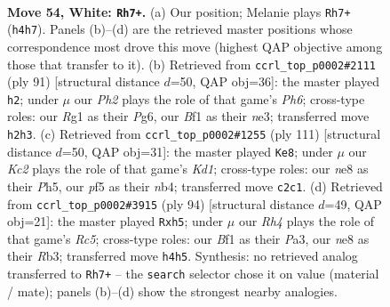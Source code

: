 \documentclass[11pt]{article}
\begin{document}
\clearpage

\begin{figure}[p]\centering
\begin{subfigure}{0.46\textwidth}\centering
\resizebox{\linewidth}{!}{%
\newchessgame
\chessboard[
  setfen={4n3/p1prk3/8/5p2/r4P1R/4B3/2K4P/5BR1 w - - 12 54},
  showmover=false,
  pgfstyle=straightmove, color=movearrow, markmove={h4-h7}
]}
\caption{}
\end{subfigure}\hfill
\begin{subfigure}{0.46\textwidth}\centering
\resizebox{\linewidth}{!}{%
\newchessgame
\chessboard[
  setfen={2rb4/5pk1/1P4p1/2P3r1/2R5/4N2p/4KP2/1R6 b - - 0 46},
  showmover=false,
  pgfstyle=straightmove, color=movearrow, markmove={h3-h2}
]}
\caption{}
\end{subfigure}
\\[4pt]
\begin{subfigure}{0.46\textwidth}\centering
\resizebox{\linewidth}{!}{%
\newchessgame
\chessboard[
  setfen={3k4/8/2P2R2/7p/1N4bP/2K2pP1/5r2/8 b - - 2 56},
  showmover=false,
  pgfstyle=straightmove, color=movearrow, markmove={d8-e8}
]}
\caption{}
\end{subfigure}\hfill
\begin{subfigure}{0.46\textwidth}\centering
\resizebox{\linewidth}{!}{%
\newchessgame
\chessboard[
  setfen={8/1r3p2/1n2pk2/1PR4p/8/PR6/r5PK/5B2 w - - 4 48},
  showmover=false,
  pgfstyle=straightmove, color=movearrow, markmove={c5-h5}
]}
\caption{}
\end{subfigure}
\caption{\textbf{Move 54, White: \texttt{Rh7+}.} (a) Our position; Melanie plays \texttt{Rh7+} (\texttt{h4h7}). Panels (b)--(d) are the retrieved master positions whose correspondence most drove this move (highest QAP objective among those that transfer to it). (b) Retrieved from \texttt{ccrl\_top\_p0002\#2111} (ply 91) [structural distance $d$=50, QAP obj=36]: the master played \texttt{h2}; under $\mu$ our \emph{Ph2} plays the role of that game's \emph{Ph6}; cross-type roles: our \emph{R}g1 as their \emph{P}g6, our \emph{B}f1 as their \emph{n}e3; transferred move \texttt{h2h3}. (c) Retrieved from \texttt{ccrl\_top\_p0002\#1255} (ply 111) [structural distance $d$=50, QAP obj=31]: the master played \texttt{Ke8}; under $\mu$ our \emph{Kc2} plays the role of that game's \emph{Kd1}; cross-type roles: our \emph{n}e8 as their \emph{P}h5, our \emph{p}f5 as their \emph{n}b4; transferred move \texttt{c2c1}. (d) Retrieved from \texttt{ccrl\_top\_p0002\#3915} (ply 94) [structural distance $d$=49, QAP obj=21]: the master played \texttt{Rxh5}; under $\mu$ our \emph{Rh4} plays the role of that game's \emph{Rc5}; cross-type roles: our \emph{B}f1 as their \emph{P}a3, our \emph{n}e8 as their \emph{R}b3; transferred move \texttt{h4h5}. Synthesis: no retrieved analog transferred to \texttt{Rh7+} -- the \texttt{search} selector chose it on value (material / mate); panels (b)--(d) show the strongest nearby analogies.}
\label{fig:thought-m106}
\end{figure}
\end{document}
